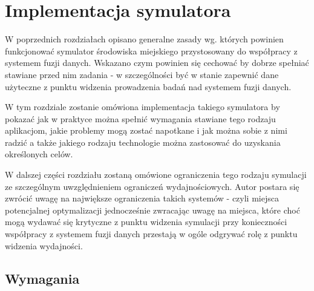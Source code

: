 \chapter{Implementacja symulatora}

\par{
W poprzednich rozdziałach opisano generalne zasady wg. których powinien funkcjonować symulator środowiska miejskiego przystosowany do współpracy z systemem fuzji danych. Wskazano czym powinien się cechować by dobrze spełniać stawiane przed nim zadania - w szczególności być w stanie zapewnić dane użyteczne z punktu widzenia prowadzenia badań nad systemem fuzji danych.
}
\par{
W tym rozdziale zostanie omówiona implementacja takiego symulatora by pokazać jak w praktyce można spełnić wymagania stawiane tego rodzaju aplikacjom, jakie problemy mogą zostać napotkane i jak można sobie z nimi radzić a także jakiego rodzaju technologie można zastosować do uzyskania określonych celów.
}
\par{
W dalszej części rozdziału zostaną omówione ograniczenia tego rodzaju symulacji ze szczególnym uwzględnieniem ograniczeń wydajnościowych. Autor postara się zwrócić uwagę na największe ograniczenia takich systemów - czyli miejsca potencjalnej optymalizacji jednocześnie zwracając uwagę na miejsca, które choć mogą wydawać się krytyczne z punktu widzenia symulacji przy konieczności współpracy z systemem fuzji danych przestają w ogóle odgrywać rolę z punktu widzenia wydajności.
}

\section[Wymagania][Wymagania]{Wymagania}

